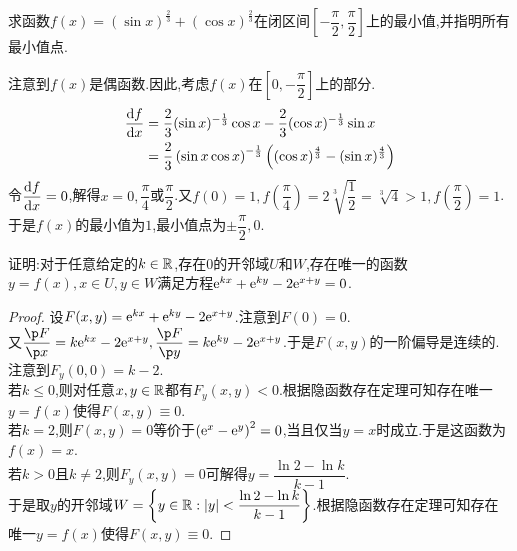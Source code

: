 \documentclass{ctexart}
\begin{document}
\begin{problem}[7.(10\songti{分})]
    求函数$f(x)=\left(\sin x\right)^{\frac{2}{3}}+\left(\cos x\right)^{\frac{2}{3}}$在闭区间$\left[-\dfrac{\pi}{2},\dfrac{\pi}{2}\right]$上的最小值,并指明所有最小值点.
\end{problem}
\begin{solution}[Solution.]
    注意到$f(x)$是偶函数.因此,考虑$f(x)$在$\left[0,-\dfrac{\pi}{2}\right]$上的部分.
    \[\begin{aligned}
        \dfrac{\mathrm{d} f}{\mathrm{d} x}
        &= \dfrac{2}{3}(\sin x)^{-\frac{1}{3}}\cos x-\dfrac{2}{3}(\cos x)^{-\frac{1}{3}}\sin x \\
        &= \dfrac{2}{3}\left(\sin x\cos x\right)^{-\frac13}\left((\cos x)^{\frac{4}{3}}-(\sin x)^{\frac{4}{3}}\right)
    \end{aligned}\]
    令$\dfrac{\mathrm{d} f}{\mathrm{d} x}=0$,解得$x=0,\dfrac\pi4$或$\dfrac\pi2$.又$f(0)=1,f\left(\dfrac\pi4\right)=2\sqrt[3]{\dfrac12}=\sqrt[3]4>1,f(\dfrac{\pi}{2})=1$.\\
    于是$f(x)$的最小值为$1$,最小值点为$\pm\dfrac\pi2,0$.
\end{solution}
\begin{problem}[8.(10\songti{分})]
    证明:对于任意给定的$k\in\mathbb{R}$,存在$0$的开邻域$U$和$W$,存在唯一的函数$y=f(x),x\in U,y\in W$满足方程$\mathrm{e}^{kx}+\mathrm{e}^{ky}-2\mathrm{e}^{x+y}=0$.
\end{problem}
\begin{proof}
    设$F(x,y)=\mathrm{e}^{kx}+\mathrm{e}^{ky}-2\mathrm{e}^{x+y}$.注意到$F(0)=0$.\\
    又$\dfrac{\p F}{\p x}=k\e^{kx}-2\e^{x+y},\dfrac{\p F}{\p y}=k\e^{ky}-2\e^{x+y}$.于是$F(x,y)$的一阶偏导是连续的.\\
    注意到$F_y(0,0)=k-2$.\\
    若$k\leqslant0$,则对任意$x,y\in\mathbb{R}$都有$F_y(x,y)<0$.根据隐函数存在定理可知存在唯一$y=f(x)$使得$F(x,y)\equiv0$.\\
    若$k=2$,则$F(x,y)=0$等价于$\left(\mathrm{e}^x-\mathrm{e}^y\right)^2=0$,当且仅当$y=x$时成立.于是这函数为$f(x)=x$.\\
    若$k>0$且$k\neq2$,则$F_y(x,y)=0$可解得$y=\dfrac{\ln 2-\ln k}{k-1}$.\\
    于是取$y$的开邻域$W=\left\{y\in\mathbb{R}:|y|<\dfrac{\ln 2-\ln k}{k-1}\right\}$.根据隐函数存在定理可知存在唯一$y=f(x)$使得$F(x,y)\equiv0$.
\end{proof}
\end{document}
